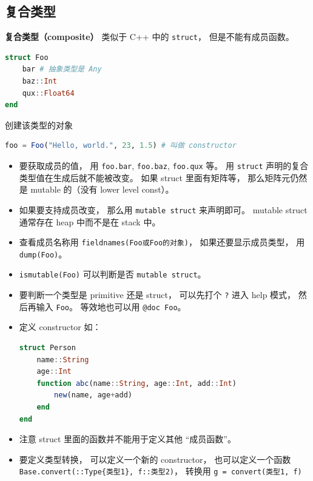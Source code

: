 \subsection{复合类型}
\textbf{复合类型（composite）} 类似于 C++ 中的 \verb`struct`， 但是不能有成员函数。
\begin{lstlisting}[language=julia]
struct Foo
    bar # 抽象类型是 Any
    baz::Int
    qux::Float64
end
\end{lstlisting}
创建该类型的对象
\begin{lstlisting}[language=julia]
foo = Foo("Hello, world.", 23, 1.5) # 叫做 constructor
\end{lstlisting}
\begin{itemize}
\item 要获取成员的值， 用 \verb`foo.bar`, \verb`foo.baz`, \verb`foo.qux` 等。 用 \verb`struct` 声明的复合类型值在生成后就不能被改变。 如果 struct 里面有矩阵等， 那么矩阵元仍然是 mutable 的（没有 lower level const）。
\item 如果要支持成员改变， 那么用 \verb`mutable struct` 来声明即可。 mutable struct 通常存在 heap 中而不是在 stack 中。
\item 查看成员名称用 \verb`fieldnames(Foo或Foo的对象)`， 如果还要显示成员类型， 用 \verb`dump(Foo)`。
\item \verb`ismutable(Foo)` 可以判断是否 \verb`mutable struct`。
\item 要判断一个类型是 primitive 还是 struct， 可以先打个 \verb`?` 进入 help 模式， 然后再输入 \verb`Foo`。 等效地也可以用 \verb`@doc Foo`。
\item 定义 constructor 如：
\begin{lstlisting}[language=julia]
struct Person
    name::String
    age::Int
    function abc(name::String, age::Int, add::Int)
        new(name, age+add)
    end
end
\end{lstlisting}
\item 注意 struct 里面的函数并不能用于定义其他 “成员函数”。
\item 要定义类型转换， 可以定义一个新的 constructor， 也可以定义一个函数 \verb`Base.convert(::Type{类型1}, f::类型2)`， 转换用 \verb`g = convert(类型1, f)`
\end{itemize}

